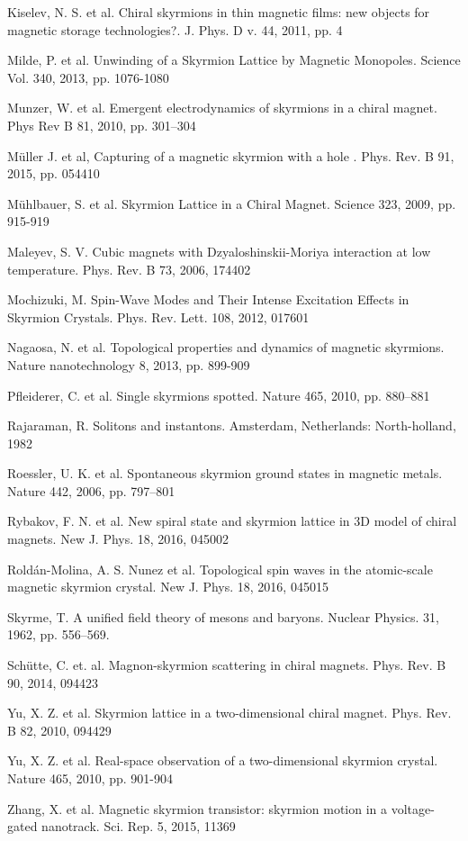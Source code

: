 \documentclass[a4paper,article,14pt]{extarticle}
\begin{document}
\begin{thebibliography}{1}
 Kiselev, N. S. et al. \flqq Chiral skyrmions in thin magnetic films: new objects for magnetic storage technologies?\frqq. J. Phys. D v. 44, 2011, pp. 4

 Milde, P. et al. \flqq Unwinding of a Skyrmion Lattice by Magnetic Monopoles\frqq. Science Vol. 340, 2013, pp. 1076-1080

 Munzer, W. et al. \flqq Emergent electrodynamics of skyrmions in a chiral magnet\frqq. Phys Rev B 81, 2010, pp. 301–304

 Müller J. et al, \flqq Capturing of a magnetic skyrmion with a hole \frqq. Phys. Rev. B 91, 2015, pp. 054410

 Mühlbauer, S. et al. \flqq Skyrmion Lattice in a Chiral Magnet\frqq. Science 323, 2009, pp. 915-919

 Maleyev, S. V. \flqq Cubic magnets with Dzyaloshinskii-Moriya interaction at low temperature\frqq. Phys. Rev. B  73, 2006, 174402

 Mochizuki, M. \flqq Spin-Wave Modes and Their Intense Excitation Effects in Skyrmion Crystals\frqq.  Phys. Rev. Lett. 108, 2012, 017601

 Nagaosa, N. et al. \flqq Topological properties and dynamics of magnetic skyrmions\frqq. Nature nanotechnology 8, 2013, pp. 899-909

 Pfleiderer, C. et al. \flqq Single skyrmions spotted\frqq. Nature 465, 2010, pp. 880–881

 Rajaraman, R. \flqq Solitons and instantons\frqq. Amsterdam, Netherlands: North-holland, 1982

 Roessler, U. K. et al. \flqq Spontaneous skyrmion ground
states in magnetic metals\frqq. Nature 442, 2006, pp. 797–801

 Rybakov, F. N. et al. \flqq New spiral state and skyrmion lattice in 3D model of chiral magnets\frqq. New J. Phys. 18, 2016, 045002

 Roldán-Molina, A. S. Nunez et al. \flqq Topological spin waves in the atomic-scale magnetic skyrmion crystal\frqq. New J. Phys. 18, 2016, 045015

 Skyrme, T. \flqq A unified field theory of mesons and baryons\frqq. Nuclear Physics. 31, 1962, pp. 556–569.

 Sch{\"u}tte, C. et. al. \flqq Magnon-skyrmion scattering in chiral magnets\frqq. Phys. Rev. B 90, 2014, 094423 

 Yu, X. Z. et al. \flqq Skyrmion lattice in a two-dimensional chiral magnet\frqq. Phys. Rev. B 82, 2010, 094429

 Yu, X. Z. et al. \flqq Real-space observation of a two-dimensional skyrmion crystal\frqq. Nature 465, 2010, pp. 901-904

 Zhang, X. et al. \flqq Magnetic skyrmion transistor: skyrmion motion in a voltage-gated nanotrack\frqq. Sci. Rep. 5, 2015, 11369

\end{thebibliography}
\end{document}
